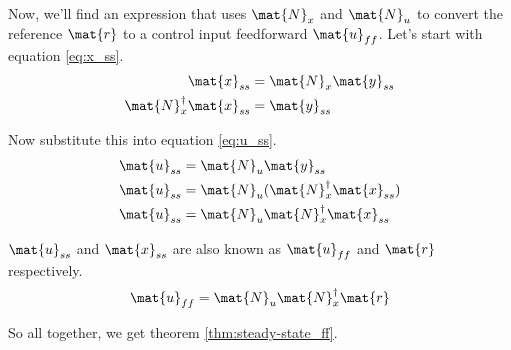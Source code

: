 Now, we'll find an expression that uses $\mat{N}_x$ and $\mat{N}_u$ to convert
the \gls{reference} $\mat{r}$ to a \gls{control input} feedforward
$\mat{u}_{ff}$. Let's start with equation \eqref{eq:x_ss}.
\begin{align*}
  \mat{x}_{ss} &= \mat{N}_x \mat{y}_{ss} \\
  \mat{N}_x^\dagger \mat{x}_{ss} &= \mat{y}_{ss}
\end{align*}

Now substitute this into equation \eqref{eq:u_ss}.
\begin{align*}
  \mat{u}_{ss} &= \mat{N}_u \mat{y}_{ss} \\
  \mat{u}_{ss} &= \mat{N}_u (\mat{N}_x^\dagger \mat{x}_{ss}) \\
  \mat{u}_{ss} &= \mat{N}_u \mat{N}_x^\dagger \mat{x}_{ss}
\end{align*}

$\mat{u}_{ss}$ and $\mat{x}_{ss}$ are also known as $\mat{u}_{ff}$ and $\mat{r}$
respectively.
\begin{align*}
  \mat{u}_{ff} = \mat{N}_u \mat{N}_x^\dagger \mat{r}
\end{align*}

So all together, we get theorem \ref{thm:steady-state_ff}.

